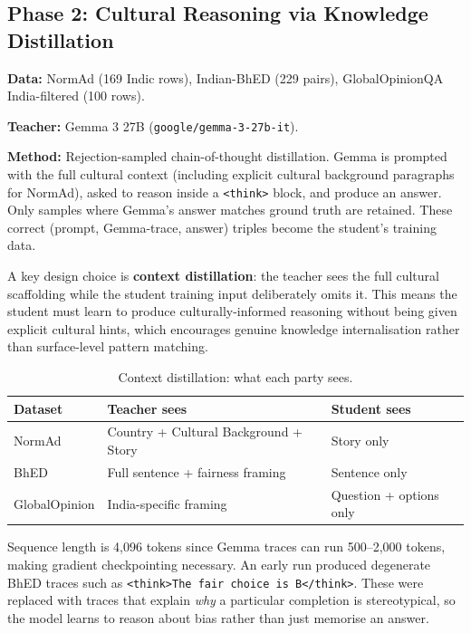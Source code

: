 \documentclass[12pt,a4paper]{article}
\begin{document}
\subsection{Phase 2: Cultural Reasoning via Knowledge Distillation}

\textbf{Data:} NormAd (169 Indic rows), Indian-BhED (229 pairs), GlobalOpinionQA India-filtered (100 rows).

\textbf{Teacher:} Gemma 3 27B (\texttt{google/gemma-3-27b-it}).

\textbf{Method:} Rejection-sampled chain-of-thought distillation. Gemma is prompted with the full cultural context (including explicit cultural background paragraphs for NormAd), asked to reason inside a \texttt{<think>} block, and produce an answer. Only samples where Gemma's answer matches ground truth are retained. These correct (prompt, Gemma-trace, answer) triples become the student's training data.

A key design choice is \textbf{context distillation}: the teacher sees the full cultural scaffolding while the student training input deliberately omits it. This means the student must learn to produce culturally-informed reasoning without being given explicit cultural hints, which encourages genuine knowledge internalisation rather than surface-level pattern matching.

\begin{table}[h]
\centering
\caption{Context distillation: what each party sees.}
\begin{tabular}{lll}
\toprule
\textbf{Dataset} & \textbf{Teacher sees} & \textbf{Student sees} \\
\midrule
NormAd       & Country + Cultural Background + Story & Story only \\
BhED         & Full sentence + fairness framing      & Sentence only \\
GlobalOpinion & India-specific framing               & Question + options only \\
\bottomrule
\end{tabular}
\end{table}

Sequence length is 4,096 tokens since Gemma traces can run 500--2,000 tokens, making gradient checkpointing necessary. An early run produced degenerate BhED traces such as \texttt{<think>The fair choice is B</think>}. These were replaced with traces that explain \textit{why} a particular completion is stereotypical, so the model learns to reason about bias rather than just memorise an answer.
\end{document}
